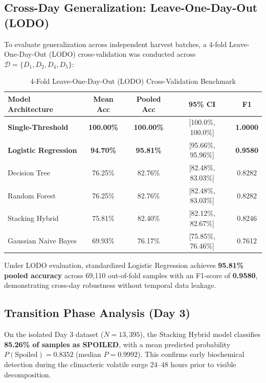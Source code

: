 \documentclass[conference]{IEEEtran}
\begin{document}
\subsection{Cross-Day Generalization: Leave-One-Day-Out (LODO)}
To evaluate generalization across independent harvest batches, a 4-fold Leave-One-Day-Out (LODO) cross-validation was conducted across $\mathcal{D} = \{D_1, D_2, D_4, D_5\}$:

\begin{table}[htbp]
\caption{4-Fold Leave-One-Day-Out (LODO) Cross-Validation Benchmark}
\begin{center}
\begin{tabular}{lcccc}
\toprule
\textbf{Model Architecture} & \textbf{Mean Acc} & \textbf{Pooled Acc} & \textbf{95\% CI} & \textbf{F1} \\
\midrule
\textbf{Single-Threshold} & \textbf{100.00\%} & \textbf{100.00\%} & [100.0\%, 100.0\%] & \textbf{1.0000} \\
\textbf{Logistic Regression} & \textbf{94.70\%} & \textbf{95.81\%} & [95.66\%, 95.96\%] & \textbf{0.9580} \\
Decision Tree & 76.25\% & 82.76\% & [82.48\%, 83.03\%] & 0.8282 \\
Random Forest & 76.25\% & 82.76\% & [82.48\%, 83.03\%] & 0.8282 \\
Stacking Hybrid & 75.81\% & 82.40\% & [82.12\%, 82.67\%] & 0.8246 \\
Gaussian Naive Bayes & 69.93\% & 76.17\% & [75.85\%, 76.46\%] & 0.7612 \\
\bottomrule
\end{tabular}
\label{tab:lodo}
\end{center}
\end{table}

Under LODO evaluation, standardized Logistic Regression achieves \textbf{95.81\% pooled accuracy} across 69,110 out-of-fold samples with an F1-score of \textbf{0.9580}, demonstrating cross-day robustness without temporal data leakage.

\subsection{Transition Phase Analysis (Day 3)}
On the isolated Day 3 dataset ($N = 13,395$), the Stacking Hybrid model classifies \textbf{85.26\% of samples as SPOILED}, with a mean predicted probability $P(\text{Spoiled}) = \mathbf{0.8352}$ (median $P = 0.9992$). This confirms early biochemical detection during the climacteric volatile surge 24--48 hours prior to visible decomposition.
\end{document}
